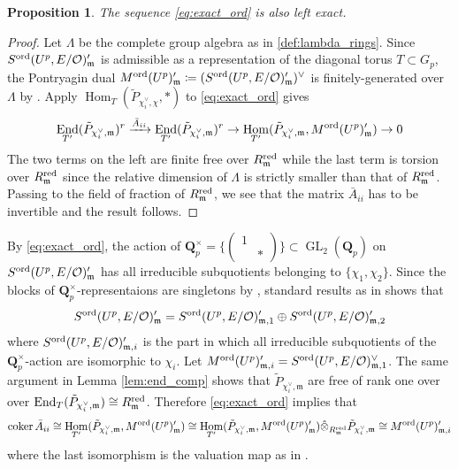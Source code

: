 \documentclass[leqno]{amsart}
\newtheorem{prop}[thm]{Proposition}
\theoremstyle{definition}
\theoremstyle{remark}
\newcommand{\smat}[1]{\left(\begin{smallmatrix} #1 \end{smallmatrix}\right)}
\newcommand{\oo}{\mathcal{O}}
\newcommand{\Qp}{\mathbf{Q}_p}
\DeclareMathOperator{\End}{End}
\DeclareMathOperator{\Hom}{Hom}
\DeclareMathOperator{\coker}{coker}
\DeclareMathOperator{\GL}{GL}
\newcommand{\fm}{\mathfrak{m}}
\newcommand{\red}{\textnormal{red}}
\newcommand{\ord}{\textnormal{ord}} %
\begin{document}
\begin{prop}    
The sequence \eqref{eq:exact_ord}
is also left exact.
\end{prop}
\begin{proof}
	Let $\Lambda$ be the complete group algebra
    as in \eqref{def:lambda_rings}.
    Since $S^{\ord}(U^p,E/\oo)_\fm'$
    is admissible as a representation of 
    the diagonal torus $T\subset G_p$,
    the Pontryagin dual
    $M^{\ord}(U^p)_\fm'\coloneqq (S^{\ord}(U^p,E/\oo)_\fm')^\vee$
    is finitely-generated over $\Lambda$
	by \cite[Lem 2.2.11]{emeI}.
	Apply $\Hom_{T}(\tilde{P}_{\chi_i^\vee,\chi},*)$
	to \eqref{eq:exact_ord} gives
\begin{equation*}
	\End_{T'}(\tilde{P}_{\chi_i^\vee,\fm})^r\xrightarrow{\bar{A}_{ii}}
	\End_{T'}(\tilde{P}_{\chi_i^\vee,\fm})^r\to 
	\Hom_{T'}(\tilde{P}_{\chi_i^\vee,\fm}, M^{\ord}(U^p)_\fm')
	\to 0
\end{equation*}
	The two terms on the left 
	are finite free over $R_{\fm}^{\red}$
	while the last term is torsion over $R_{\fm}^\red$
    since the relative dimension of $\Lambda$ is
	strictly smaller than that of $R_{\fm}^{\red}$.
	Passing to the field of fraction of $R_{\fm}^{\red}$,
	we see that the matrix $\bar{A}_{ii}$ has to be invertible
	and the result follows.
\end{proof}

By \eqref{eq:exact_ord},
the action of 
$\Qp^\times=\{\smat{1&\\&*}\}\subset \GL_2(\Qp)$
on $S^{\ord}(U^p,E/\oo)_{\fm}'$
has all irreducible subquotients 
belonging to $\{\chi_1,\chi_2\}$.
Since the blocks of $\Qp^\times$-representaions
are singletons by \cite[Lem 3.34]{pask},
standard results as in \cite[Prop. 5.34]{pask}
shows that 
\begin{equation}\label{eq:sub12}
 S^{\ord}(U^p,E/\oo)_{\fm}'=
 S^{\ord}(U^p,E/\oo)_{\fm,1}'\oplus S^{\ord}(U^p,E/\oo)_{\fm,2}'
\end{equation}
where $S^{\ord}(U^p,E/\oo)_{\fm,i}'$ is
the part in which all irreducible subquotients
of the $\Qp^\times$-action are isomorphic to $\chi_i$.
Let $M^{\ord}(U^p)_{\fm,i}'=S^{\ord}(U^p,E/\oo)_{\fm,1}^\vee$.
The same argument in Lemma \ref{lem:end_comp}
shows that $\tilde{P}_{\chi_i^\vee,\fm}$
are free of rank one over 
over $\End_T(\tilde{P}_{\chi_i^\vee,\fm})\cong R_\fm^{\red}$.
Therefore \eqref{eq:exact_ord} implies that
\begin{equation}\label{eq:separate}
    \coker\bar{A}_{ii}\cong 
    \Hom_{T'}(\tilde{P}_{\chi_i^\vee,\fm}, M^{\ord}(U^p)_\fm')\cong
    \Hom_{T'}(\tilde{P}_{\chi_i^\vee,\fm}, M^{\ord}(U^p)_\fm')
    \hat{\otimes}_{R^{\red}_\fm}\tilde{P}_{\chi_i^\vee,\fm}\cong
    M^{\ord}(U^p)_{\fm, i}'
\end{equation}
where the last isomorphism is the valuation map
as in \cite[Lem. 3.24]{pask}.
\end{document}

